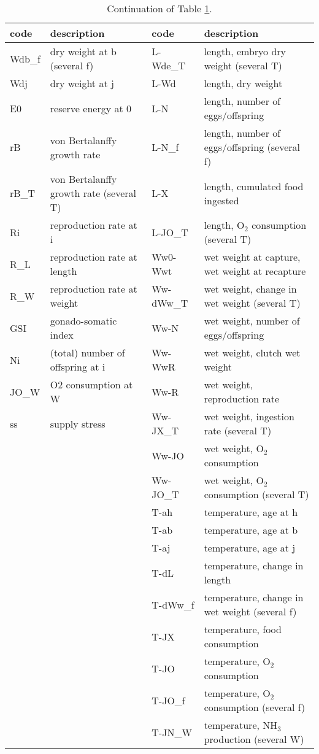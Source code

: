 \begin{table}\small
\caption{\label{tab:codes}\protect\small
Continuation of Table \ref{tab:codes}.}

\begin{tabular}{ll|ll} \hline
\textbf{code} & \textbf{description} & \textbf{code} & \textbf{description}\\ \hline

Wdb\_f & dry weight at b (several f) & L-Wde\_T & length, embryo dry weight (several T)\\ 
Wdj & dry weight at j & L-Wd & length, dry weight\\ 
E0 & reserve energy at 0 & L-N & length, number of eggs/offspring\\ 
rB & von Bertalanffy growth rate & L-N\_f & length, number of eggs/offspring (several f)\\ 
rB\_T & von Bertalanffy growth rate (several  T) & L-X & length, cumulated food ingested\\ 
Ri & reproduction rate at i & L-JO\_T & length, O$_2$ consumption (several T)\\ 
R\_L & reproduction rate at length & Ww0-Wwt & wet weight at capture, wet weight at recapture\\ 
R\_W & reproduction rate at weight & Ww-dWw\_T & wet weight, change in wet weight (several T)\\ 
GSI & gonado-somatic index & Ww-N & wet weight, number of eggs/offspring\\ 
Ni & (total) number of offspring at i & Ww-WwR & wet weight, clutch wet weight\\ 
JO\_W & O2 consumption at W & Ww-R & wet weight, reproduction rate\\ 
ss & supply stress & Ww-JX\_T & wet weight, ingestion rate (several T)\\ 
  &   & Ww-JO & wet weight, O$_2$ consumption\\ 
  &   & Ww-JO\_T & wet weight, O$_2$ consumption (several T)\\ 
  &   & T-ah & temperature, age at h\\ 
  &   & T-ab & temperature, age at b\\ 
  &   & T-aj & temperature, age at j\\ 
  &   & T-dL & temperature, change in length\\ 
  &   & T-dWw\_f & temperature, change in wet weight (several f)\\ 
  &   & T-JX & temperature, food consumption\\ 
  &   & T-JO & temperature, O$_2$ consumption\\ 
  &   & T-JO\_f & temperature, O$_2$ consumption (several f)\\ 
  &   & T-JN\_W & temperature, NH$_3$ production (several W)\\ 
\hline
\end{tabular}
\end{table}
